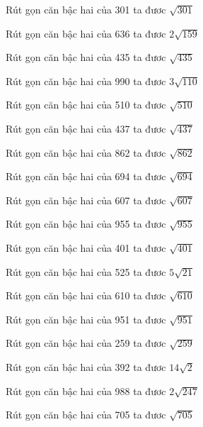\documentclass[12pt,a4paper]{article}
\begin{document}
\begin{ex}
Rút gọn căn bậc hai của 301 ta đươc $\sqrt{301}$
\end{ex}
\begin{ex}
Rút gọn căn bậc hai của 636 ta đươc $2\sqrt{159}$
\end{ex}
\begin{ex}
Rút gọn căn bậc hai của 435 ta đươc $\sqrt{435}$
\end{ex}
\begin{ex}
Rút gọn căn bậc hai của 990 ta đươc $3\sqrt{110}$
\end{ex}
\begin{ex}
Rút gọn căn bậc hai của 510 ta đươc $\sqrt{510}$
\end{ex}
\begin{ex}
Rút gọn căn bậc hai của 437 ta đươc $\sqrt{437}$
\end{ex}
\begin{ex}
Rút gọn căn bậc hai của 862 ta đươc $\sqrt{862}$
\end{ex}
\begin{ex}
Rút gọn căn bậc hai của 694 ta đươc $\sqrt{694}$
\end{ex}
\begin{ex}
Rút gọn căn bậc hai của 607 ta đươc $\sqrt{607}$
\end{ex}
\begin{ex}
Rút gọn căn bậc hai của 955 ta đươc $\sqrt{955}$
\end{ex}
\begin{ex}
Rút gọn căn bậc hai của 401 ta đươc $\sqrt{401}$
\end{ex}
\begin{ex}
Rút gọn căn bậc hai của 525 ta đươc $5\sqrt{21}$
\end{ex}
\begin{ex}
Rút gọn căn bậc hai của 610 ta đươc $\sqrt{610}$
\end{ex}
\begin{ex}
Rút gọn căn bậc hai của 951 ta đươc $\sqrt{951}$
\end{ex}
\begin{ex}
Rút gọn căn bậc hai của 259 ta đươc $\sqrt{259}$
\end{ex}
\begin{ex}
Rút gọn căn bậc hai của 392 ta đươc $14\sqrt{2}$
\end{ex}
\begin{ex}
Rút gọn căn bậc hai của 988 ta đươc $2\sqrt{247}$
\end{ex}
\begin{ex}
Rút gọn căn bậc hai của 705 ta đươc $\sqrt{705}$
\end{ex}
\end{document}
